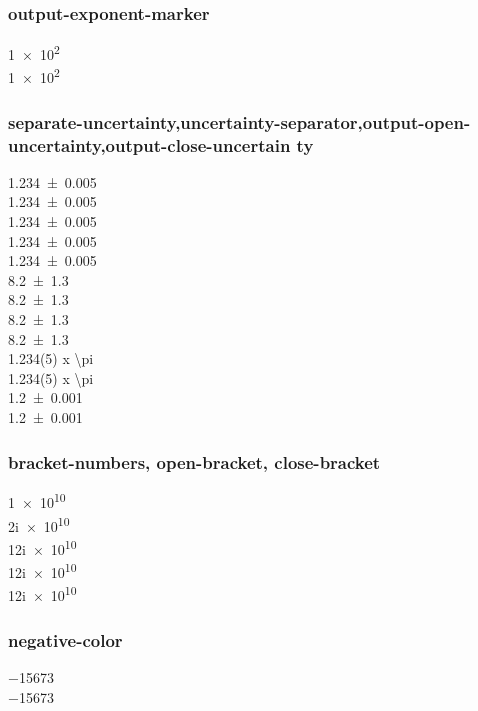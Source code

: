 \documentclass{article}
\begin{document}
\subsubsection{output-exponent-marker}
\num[output-exponent-marker = \text{e}]{1e2} \\
\num[output-exponent-marker = \ensuremath{\mathrm{E}}]{1e2}\\

\subsubsection{separate-uncertainty,uncertainty-separator,output-open-uncertainty,output-close-uncertain
ty}
{
\num{1.234(5)} \\
\num{1.234\pm 0.005} \\
\num[separate-uncertainty = true]{1.234(5)} \\
\num[separate-uncertainty = true]{1.234\pm 0.005} \\
\num{1.234(5)}\\
}
\num{8.2(13)} \\
\num{8.2\pm1.3} \\
\num[separate-uncertainty]{8.2(13)}\\
\num[separate-uncertainty]{8.2\pm1.3} \\

\num{1.234(5) x \pi} \\
\num[separate-uncertainty = true]{1.234(5) x \pi} \\

\num{1.2 +- 0.001}\\
\num[separate-uncertainty]{1.2 +- 0.001}\\

\subsubsection{bracket-numbers, open-bracket, close-bracket}
{
\num{1 e10} \\
\num{2i e10} \\
\num{1+2i e10} \\
\num[bracket-numbers = false]{1+2i e10} \\
\num{1+2i e10}\\
}

\subsubsection{negative-color}
\num{-15673} \\
\num[negative-color = red]{-15673}
\end{document}
